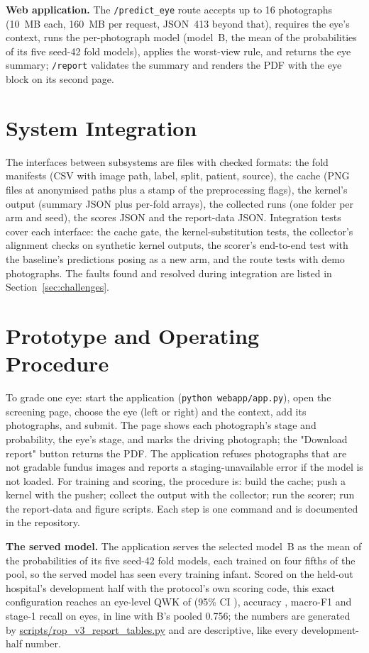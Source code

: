 \textbf{Web application.} The \texttt{/predict\_eye} route accepts up to 16 photographs (10~MB each, 160~MB per request, JSON~413 beyond that), requires the eye's context, runs the per-photograph model (model~B, the mean of the probabilities of its five seed-42 fold models), applies the worst-view rule, and returns the eye summary; \texttt{/report} validates the summary and renders the PDF with the eye block on its second page.

\section{System Integration}
The interfaces between subsystems are files with checked formats: the fold manifests (CSV with image path, label, split, patient, source), the cache (PNG files at anonymised paths plus a stamp of the preprocessing flags), the kernel's output (summary JSON plus per-fold arrays), the collected runs (one folder per arm and seed), the scores JSON and the report-data JSON. Integration tests cover each interface: the cache gate, the kernel-substitution tests, the collector's alignment checks on synthetic kernel outputs, the scorer's end-to-end test with the baseline's predictions posing as a new arm, and the route tests with demo photographs. The faults found and resolved during integration are listed in Section~\ref{sec:challenges}.

\section{Prototype and Operating Procedure}
To grade one eye: start the application (\texttt{python webapp/app.py}), open the screening page, choose the eye (left or right) and the context, add its photographs, and submit. The page shows each photograph's stage and probability, the eye's stage, and marks the driving photograph; the "Download report" button returns the PDF. The application refuses photographs that are not gradable fundus images and reports a staging-unavailable error if the model is not loaded. For training and scoring, the procedure is: build the cache; push a kernel with the pusher; collect the output with the collector; run the scorer; run the report-data and figure scripts. Each step is one command and is documented in the repository.

\textbf{The served model.} The application serves the selected model~B as the mean of the probabilities of its five seed-42 fold models, each trained on four fifths of the pool, so the served model has seen every training infant. Scored on the held-out hospital's development half with the protocol's own scoring code, this exact configuration reaches an eye-level QWK of \DeployedQWK{} (95\% CI \DeployedQWKCI), accuracy \DeployedAcc{}, macro-F1 \DeployedMF{} and stage-1 recall \DeployedSOne{} on \DeployedEyes{} eyes, in line with B's pooled 0.756; the numbers are generated by \url{scripts/rop_v3_report_tables.py} and are descriptive, like every development-half number.

